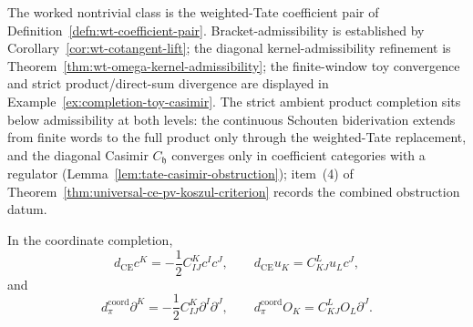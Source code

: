 \documentclass[11pt]{memoir}
\begin{document}
\begin{defn}
  The worked nontrivial class is the weighted-Tate coefficient pair of
  Definition~\ref{defn:wt-coefficient-pair}.  Bracket-admissibility is
  established by Corollary~\ref{cor:wt-cotangent-lift}; the diagonal
  kernel-admissibility refinement is
  Theorem~\ref{thm:wt-omega-kernel-admissibility}; the finite-window toy
  convergence and strict product/direct-sum divergence are displayed in
  Example~\ref{ex:completion-toy-casimir}.  The strict ambient product
  completion sits below admissibility at both levels: the continuous
  Schouten biderivation extends from finite words to the full product only
  through the weighted-Tate replacement, and the diagonal Casimir
  \(C_{\mathfrak h}\) converges only in coefficient categories with a
  regulator (Lemma~\ref{lem:tate-casimir-obstruction}); item~(4) of
  Theorem~\ref{thm:universal-ce-pv-koszul-criterion} records the combined
  obstruction datum.
\end{defn}

\begin{lem}\label{lem:formal-disk-ce-schouten-continuity}
  In the coordinate completion,
  \[
    d_{\mathrm{CE}}c^K=-\frac12 C^K_{IJ}c^Ic^J,\qquad
    d_{\mathrm{CE}}u_K=C^L_{KJ}u_Lc^J,
  \]
  and
  \[
    d_\pi^{\mathrm{coord}}\partial^K
      =-\frac12 C^K_{IJ}\partial^I\partial^J,\qquad
    d_\pi^{\mathrm{coord}}O_K=C^L_{KJ}O_L\partial^J .
  \]
\end{lem}
\end{document}
